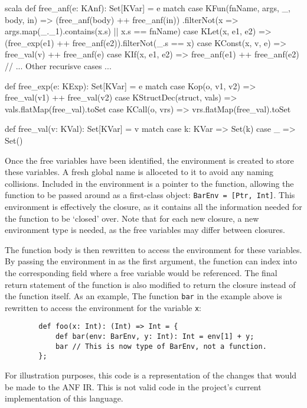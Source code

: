 \begin{code}{scala}
    def free_anf(e: KAnf): Set[KVar] = e match {
        case KFun(fnName, args, _, body, in) =>
            (free_anf(body) ++ free_anf(in))
                .filterNot(x => args.map(_._1).contains(x.s) || x.s == fnName)
        case KLet(x, e1, e2) => (free_exp(e1) ++ free_anf(e2)).filterNot(_.s == x)
        case KConst(x, v, e) => free_val(v) ++ free_anf(e)
        case KIf(x, e1, e2) => free_anf(e1) ++ free_anf(e2)
        // ... Other recurisve cases ...
    }

    def free_exp(e: KExp): Set[KVar] = e match {
        case Kop(o, v1, v2) => free_val(v1) ++ free_val(v2)
        case KStructDec(struct, vals) => vals.flatMap(free_val).toSet
        case KCall(o, vrs) => vrs.flatMap(free_val).toSet
    }

    def free_val(v: KVal): Set[KVar] = v match {
        case k: KVar => Set(k)
        case _ => Set()
    }
\end{code}

Once the free variables have been identified, the environment is created to store these
variables. A fresh global name is alloceted to it to avoid any naming collisions.
Included in the environment is a pointer to the function, allowing the function to be passed around
as a first-class object:
\texttt{BarEnv = [Ptr, Int]}.
This environment is effectively the closure, as it contains all the information needed for the
function to be `closed' over. Note that for each new closure, a new environment type is needed, as
the free variables may differ between closures.

The function body is then rewritten to access the environment for these variables. By passing the
environment in as the first argument, the function can index into the corresponding field where a
free variable would be referenced. The final return statement of the function is also modified to
return the closure instead of the function itself. As an example, The function \texttt{bar} in the
example above is rewritten to access the environment for the variable \texttt{x}:

\begin{tcolorbox}
    \begin{verbatim}
        def foo(x: Int): (Int) => Int = {
            def bar(env: BarEnv, y: Int): Int = env[1] + y;
            bar // This is now type of BarEnv, not a function.
        };
    \end{verbatim}
    \tcblower
    \footnotesize
    For illustration purposes, this code is a representation of the changes that would be made
    to the ANF IR. This is not valid code in the project's current implementation of this language.
\end{tcolorbox}

